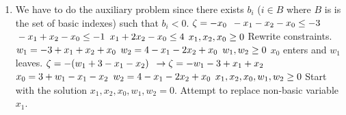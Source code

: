 \documentclass{article}
\begin{document}
\begin{enumerate}
\begin{enumerate}
\begin{enumerate} [label = \roman*]
                $\\\to \zeta = - 3x_1 - 19x_2 - 4x_3 - 9w_2 + 27$
                \newline Rewrite constraints.
                $\\ w_1 = 5 - 2x_1 - x_2 - x_3 - 3x_4$
                $\\ 2x_4 = 3 - x_1 - 3x_2 - x_3 - w_2$
                $\\ x_1, x_2, x_3, x_4, w_1, w_2 \geq 0$
                \newline Decreasing $x_1, x_2, x_3, w_2$ would violate a constraint. Increasing $x_1, x_2, x_3, w_2$ would only decrease the objective function. Therefore, the optimal solution is at:
                \newline $x_1, x_2, x_3 = 0$
                \newline $x_4 = \frac{3}{2}$
            \item
                We have to do the auxiliary problem since there exists $b_i$ ($i \in B$ where $B$ is is the set of basic indexes) such that $b_i < 0$.
                $\\\zeta = -x_0$
                $\\ -x_1 - x_2 - x_0 \leq -3$
                $\\ -x_1 + x_2 - x_0 \leq -1$
                $\\ x_1 + 2x_2 - x_0 \leq 4$
                $\\ x_1, x_2, x_0 \geq 0$
                \newline Rewrite constraints.
                $\\ w_1 = - 3 + x_1 + x_2 + x_0$
                $\\ w_2 = 4 - x_1 - 2x_2 + x_0$
                $\\ w_1, w_2 \geq 0$
                \newline $x_0$ enters and $w_1$ leaves.
                $\\\zeta = -(w_1 + 3 - x_1 - x_2)$
                $\\\to \zeta = -w_1 - 3 + x_1 + x_2$
                $\\ x_0 = 3 + w_1 - x_1 - x_2$
                $\\ w_2 = 4 - x_1 - 2x_2 + x_0$
                $\\ x_1, x_2, x_0, w_1, w_2 \geq 0$
                \newline Start with the solution $x_1, x_2, x_0, w_1, w_2 = 0$.
                \newline Attempt to replace non-basic variable $x_1$.

\end{enumerate}
\end{enumerate}
\end{enumerate}
\end{document}
